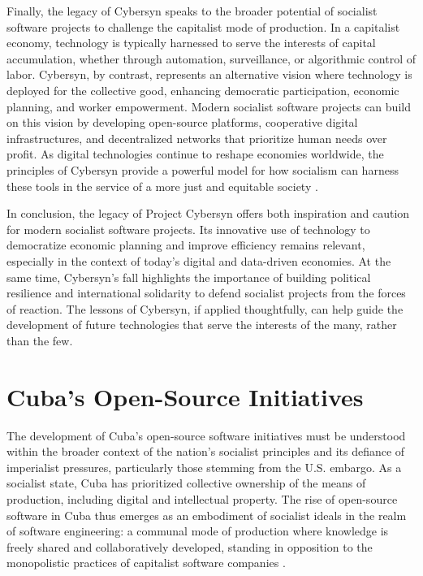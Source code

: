 \begin{refsection}
Finally, the legacy of Cybersyn speaks to the broader potential of socialist software projects to challenge the capitalist mode of production. In a capitalist economy, technology is typically harnessed to serve the interests of capital accumulation, whether through automation, surveillance, or algorithmic control of labor. Cybersyn, by contrast, represents an alternative vision where technology is deployed for the collective good, enhancing democratic participation, economic planning, and worker empowerment. Modern socialist software projects can build on this vision by developing open-source platforms, cooperative digital infrastructures, and decentralized networks that prioritize human needs over profit. As digital technologies continue to reshape economies worldwide, the principles of Cybersyn provide a powerful model for how socialism can harness these tools in the service of a more just and equitable society \cite[pp.~175-178]{medina2014}.

In conclusion, the legacy of Project Cybersyn offers both inspiration and caution for modern socialist software projects. Its innovative use of technology to democratize economic planning and improve efficiency remains relevant, especially in the context of today’s digital and data-driven economies. At the same time, Cybersyn’s fall highlights the importance of building political resilience and international solidarity to defend socialist projects from the forces of reaction. The lessons of Cybersyn, if applied thoughtfully, can help guide the development of future technologies that serve the interests of the many, rather than the few.

\section{Cuba's Open-Source Initiatives}

The development of Cuba's open-source software initiatives must be understood within the broader context of the nation's socialist principles and its defiance of imperialist pressures, particularly those stemming from the U.S. embargo. As a socialist state, Cuba has prioritized collective ownership of the means of production, including digital and intellectual property. The rise of open-source software in Cuba thus emerges as an embodiment of socialist ideals in the realm of software engineering: a communal mode of production where knowledge is freely shared and collaboratively developed, standing in opposition to the monopolistic practices of capitalist software companies \cite[pp.~90-112]{gunderfrank}.


\end{refsection}

